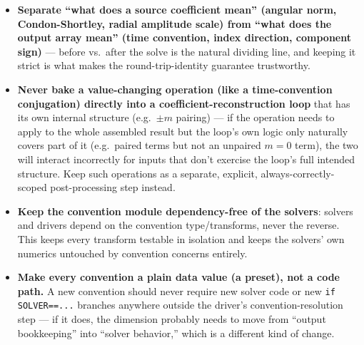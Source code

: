 \documentclass[11pt]{article}
\begin{document}
\begin{itemize}
\item \textbf{Separate ``what does a source coefficient mean'' (angular norm, Condon-Shortley,
radial amplitude scale) from ``what does the output array mean'' (time convention, index
direction, component sign)} --- before vs.\ after the solve is the natural dividing line, and
keeping it strict is what makes the round-trip-identity guarantee trustworthy.
\item \textbf{Never bake a value-changing operation (like a time-convention conjugation) directly
into a coefficient-reconstruction loop} that has its own internal structure (e.g.\ $\pm m$
pairing) --- if the operation needs to apply to the whole assembled result but the loop's own
logic only naturally covers part of it (e.g.\ paired terms but not an unpaired $m=0$ term), the
two will interact incorrectly for inputs that don't exercise the loop's full intended structure.
Keep such operations as a separate, explicit, always-correctly-scoped post-processing step
instead.
\item \textbf{Keep the convention module dependency-free of the solvers}: solvers and drivers
depend on the convention type/transforms, never the reverse. This keeps every transform testable
in isolation and keeps the solvers' own numerics untouched by convention concerns entirely.
\item \textbf{Make every convention a plain data value (a preset), not a code path.} A new
convention should never require new solver code or new \texttt{if SOLVER==...} branches anywhere
outside the driver's convention-resolution step --- if it does, the dimension probably needs to
move from ``output bookkeeping'' into ``solver behavior,'' which is a different kind of change.
\end{itemize}
\end{document}
